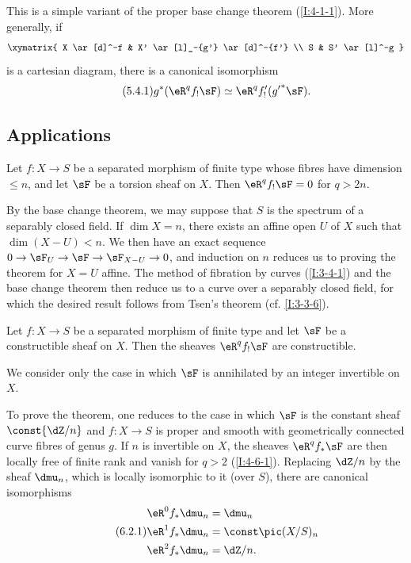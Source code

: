 This is a simple variant of the proper base change theorem
(\ref{I:4-1-1}). More generally, if
\[\xymatrix{
  X \ar[d]^-f
    & X' \ar[l]_-{g'} \ar[d]^-{f'} \\
  S
    & S' \ar[l]^-g
}\]
is a cartesian diagram, there is a canonical isomorphism
\begin{equation*}\tag{5.4.1}\label{I:eq:4-5-4-1}
  g^* (\eR^q f_! \sF) \simeq \eR^q f'_!({g'}^* \sF) \text{.}
\end{equation*}

\subsection{Applications}\label{I:4-6}

\begin{theorem}\label{I:4-6-1}
Let $f:X\to S$ be a separated morphism of finite type whose fibres have
dimension $\leqslant n$, and let $\sF$ be a torsion sheaf on $X$. Then
$\eR^qf_!\sF=0$ for $q>2n$.
\end{theorem}

By the base change theorem, we may suppose that $S$ is the spectrum of a
separably closed field. If $\dim X=n$, there exists an affine open
$U$ of $X$ such that $\dim(X- U)<n$. We then have an exact
sequence $0\to\sF_U\to\sF\to\sF_{X- U}\to0$, and induction on
$n$ reduces us to proving the theorem for $X=U$ affine. The method of
fibration by curves (\ref{I:3-4-1}) and the base change theorem then
reduce us to a curve over a separably closed field, for which the desired
result follows from Tsen's theorem (cf. \ref{I:3-3-6}).

\begin{theorem}\label{I:4-6-2}
Let $f:X\to S$ be a separated morphism of finite type and let $\sF$ be
a constructible sheaf on $X$. Then the sheaves $\eR^qf_!\sF$ are
constructible.
\end{theorem}

We consider only the case in which $\sF$ is annihilated by an integer
invertible on $X$.

To prove the theorem, one reduces to the case in which $\sF$ is the
constant sheaf $\const{\dZ/n}$ and $f:X\to S$ is proper and smooth with
geometrically connected curve fibres of genus $g$. If $n$ is invertible
on $X$, the sheaves $\eR^qf_*\sF$ are then locally free of finite rank
and vanish for $q>2$ (\ref{I:4-6-1}). Replacing $\dZ/n$ by the sheaf
$\dmu_n$, which is locally isomorphic to it (over $S$), there are
canonical isomorphisms
\begin{equation*}\tag{6.2.1}\label{I:eq:4-6-2-1}
\begin{aligned}
  \eR^0 f_* \dmu_n &= \dmu_n \\
  \eR^1 f_* \dmu_n &= \const\pic(X/S)_n \\
  \eR^2 f_* \dmu_n &= \dZ/n \text{.}
\end{aligned}
\end{equation*}

